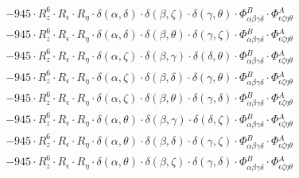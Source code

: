 \documentclass{article}
\begin{document}
\begin{equation}
\begin{array}{c}
 \\[0.2em] 		 - 945 \cdot R_{z}^{6} \cdot R_{\epsilon{}} \cdot R_{\eta{}} \cdot \delta{}\left(\alpha{}, \delta{}\right) \cdot \delta{}\left(\beta{}, \zeta{}\right) \cdot \delta{}\left(\gamma{}, \theta{}\right) \cdot \Phi{}^{B}_{\alpha{}\beta{}\gamma{}\delta{}} \cdot \Phi{}^{A}_{\epsilon{}\zeta{}\eta{}\theta{}} 
 \\[0.2em] 		 - 945 \cdot R_{z}^{6} \cdot R_{\epsilon{}} \cdot R_{\eta{}} \cdot \delta{}\left(\alpha{}, \delta{}\right) \cdot \delta{}\left(\beta{}, \theta{}\right) \cdot \delta{}\left(\gamma{}, \zeta{}\right) \cdot \Phi{}^{B}_{\alpha{}\beta{}\gamma{}\delta{}} \cdot \Phi{}^{A}_{\epsilon{}\zeta{}\eta{}\theta{}} 
 \\[0.2em] 		 - 945 \cdot R_{z}^{6} \cdot R_{\epsilon{}} \cdot R_{\eta{}} \cdot \delta{}\left(\alpha{}, \zeta{}\right) \cdot \delta{}\left(\beta{}, \gamma{}\right) \cdot \delta{}\left(\delta{}, \theta{}\right) \cdot \Phi{}^{B}_{\alpha{}\beta{}\gamma{}\delta{}} \cdot \Phi{}^{A}_{\epsilon{}\zeta{}\eta{}\theta{}} 
 \\[0.2em] 		 - 945 \cdot R_{z}^{6} \cdot R_{\epsilon{}} \cdot R_{\eta{}} \cdot \delta{}\left(\alpha{}, \zeta{}\right) \cdot \delta{}\left(\beta{}, \delta{}\right) \cdot \delta{}\left(\gamma{}, \theta{}\right) \cdot \Phi{}^{B}_{\alpha{}\beta{}\gamma{}\delta{}} \cdot \Phi{}^{A}_{\epsilon{}\zeta{}\eta{}\theta{}} 
 \\[0.2em] 		 - 945 \cdot R_{z}^{6} \cdot R_{\epsilon{}} \cdot R_{\eta{}} \cdot \delta{}\left(\alpha{}, \zeta{}\right) \cdot \delta{}\left(\beta{}, \theta{}\right) \cdot \delta{}\left(\gamma{}, \delta{}\right) \cdot \Phi{}^{B}_{\alpha{}\beta{}\gamma{}\delta{}} \cdot \Phi{}^{A}_{\epsilon{}\zeta{}\eta{}\theta{}} 
 \\[0.2em] 		 - 945 \cdot R_{z}^{6} \cdot R_{\epsilon{}} \cdot R_{\eta{}} \cdot \delta{}\left(\alpha{}, \theta{}\right) \cdot \delta{}\left(\beta{}, \gamma{}\right) \cdot \delta{}\left(\delta{}, \zeta{}\right) \cdot \Phi{}^{B}_{\alpha{}\beta{}\gamma{}\delta{}} \cdot \Phi{}^{A}_{\epsilon{}\zeta{}\eta{}\theta{}} 
 \\[0.2em] 		 - 945 \cdot R_{z}^{6} \cdot R_{\epsilon{}} \cdot R_{\eta{}} \cdot \delta{}\left(\alpha{}, \theta{}\right) \cdot \delta{}\left(\beta{}, \delta{}\right) \cdot \delta{}\left(\gamma{}, \zeta{}\right) \cdot \Phi{}^{B}_{\alpha{}\beta{}\gamma{}\delta{}} \cdot \Phi{}^{A}_{\epsilon{}\zeta{}\eta{}\theta{}} 
 \\[0.2em] 		 - 945 \cdot R_{z}^{6} \cdot R_{\epsilon{}} \cdot R_{\eta{}} \cdot \delta{}\left(\alpha{}, \theta{}\right) \cdot \delta{}\left(\beta{}, \zeta{}\right) \cdot \delta{}\left(\gamma{}, \delta{}\right) \cdot \Phi{}^{B}_{\alpha{}\beta{}\gamma{}\delta{}} \cdot \Phi{}^{A}_{\epsilon{}\zeta{}\eta{}\theta{}} 

\end{array}
\end{equation}
\end{document}
